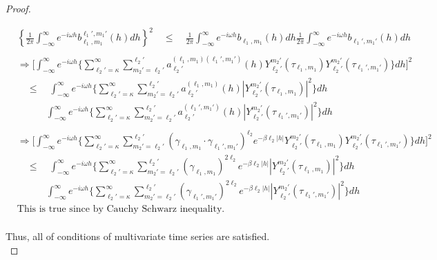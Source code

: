 \documentclass[11pt]{article}
\begin{document}
\begin{itemize}
\begin{proof}
\begin{enumerate}
\begin{align*}
&\left\{ \frac{1}{2\pi} \int_{-\infty}^\infty e^{-i\omega h} b_{\ell_1,m_1}^{\ell_1',m_1'}(h) dh \right\}^2 \quad \le \quad \frac{1}{2\pi} \int_{-\infty}^\infty e^{-i\omega h} b_{\ell_1,m_1}(h) dh \frac{1}{2\pi} \int_{-\infty}^\infty e^{-i\omega h} b_{\ell_1',m_1'}(h) dh \\
\\
&\Rightarrow \biggl[ \int_{-\infty}^\infty e^{-i\omega h} \biggl\{ \sum_{\ell_2'=\kappa}^{\infty} \sum_{m_2'=\ell_2'}^{\ell_2'} a_{\ell_2'}^{(\ell_1,m_1)(\ell_1',m_1')}(h) Y_{\ell_2'}^{m_2'}(\tau_{\ell_1,m_1}) Y_{\ell_2'}^{m_2'}(\tau_{\ell_1',m_1'}) \biggl\} dh \biggl]^2\\ 
&\quad \le \quad \int_{-\infty}^\infty e^{-i\omega h} \biggl\{ \sum_{\ell_2'=\kappa}^{\infty} \sum_{m_2'=\ell_2'}^{\ell_2'} a_{\ell_2'}^{(\ell_1,m_1)}(h) |Y_{\ell_2'}^{m_2'}(\tau_{\ell_1,m_1})|^2 \biggl\} dh\\
&\quad \quad \quad \int_{-\infty}^\infty e^{-i\omega h} \biggl\{ \sum_{\ell_2'=\kappa}^{\infty} \sum_{m_2'=\ell_2'}^{\ell_2'} a_{\ell_2'}^{(\ell_1',m_1')}(h) |Y_{\ell_2'}^{m_2'}(\tau_{\ell_1',m_1'})|^2 \biggl\} dh\\
\\
&\Rightarrow \biggl[ \int_{-\infty}^\infty e^{-i\omega h} \biggl\{ \sum_{\ell_2'=\kappa}^{\infty} \sum_{m_2'=\ell_2'}^{\ell_2'} (\gamma_{\ell_1,m_1} \cdot \gamma_{\ell_1',m_1'})^{\ell_2} e^{-\beta \ell_2 |h|} Y_{\ell_2'}^{m_2'}(\tau_{\ell_1,m_1}) Y_{\ell_2'}^{m_2'}(\tau_{\ell_1',m_1'}) \biggl\} dh \biggl]^2\\ 
&\quad \le \quad \int_{-\infty}^\infty e^{-i\omega h} \biggl\{ \sum_{\ell_2'=\kappa}^{\infty} \sum_{m_2'=\ell_2'}^{\ell_2'} (\gamma_{\ell_1,m_1})^{2 \ell_2} e^{-\beta \ell_2 |h|} |Y_{\ell_2'}^{m_2'}(\tau_{\ell_1,m_1})|^2 \biggl\} dh\\
&\quad \quad \quad \int_{-\infty}^\infty e^{-i\omega h} \biggl\{ \sum_{\ell_2'=\kappa}^{\infty} \sum_{m_2'=\ell_2'}^{\ell_2'} (\gamma_{\ell_1',m_1'})^{2 \ell_2} e^{-\beta \ell_2 |h|} |Y_{\ell_2'}^{m_2'}(\tau_{\ell_1',m_1'})|^2 \biggl\} dh\\
&\text{This is true since by Cauchy Schwarz inequality.}\\
\end{align*}


\end{enumerate}

Thus, all of conditions of multivariate time series are satisfied.\\


\end{proof}
\end{itemize}
\end{document}
